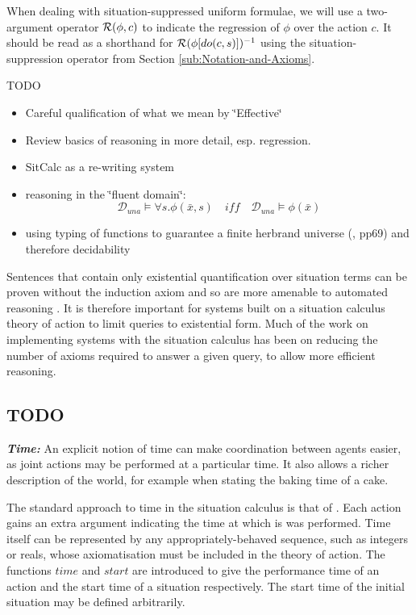 When dealing with situation-suppressed uniform formulae, we will use
a two-argument operator $\mathcal{R}(\phi,c)$ to indicate the regression
of $\phi$ over the action $c$. It should be read as a shorthand
for $\mathcal{R}(\phi[do(c,s)])^{-1}$ using the situation-suppression operator
from Section \ref{sub:Notation-and-Axioms}.

TODO

\begin{itemize}
\item Careful qualification of what we mean by \char`\"{}Effective\char`\"{} 
\item Review basics of reasoning in more detail, esp. regression. 
\item SitCalc as a re-writing system 
\item reasoning in the \char`\"{}fluent domain\char`\"{}: \[
\mathcal{D}_{una}\models\forall s.\phi(\bar{x},s)\,\,\,\,\,\, iff\,\,\,\,\,\,\mathcal{D}_{una}\models\phi(\bar{x})\]

\item using typing of functions to guarantee a finite herbrand universe
(\citet{levesque04krr_book}, pp69) and therefore decidability 
\end{itemize}
Sentences that contain only existential quantification over situation
terms can be proven without the induction axiom and so are more amenable
to automated reasoning \citep{pirri99contributions_sitcalc}. It is
therefore important for systems built on a situation calculus theory
of action to limit queries to existential form. Much of the work on
implementing systems with the situation calculus has been on reducing
the number of axioms required to answer a given query, to allow more
efficient reasoning.


\subsection{TODO}

\textbf{\emph{Time:}} An explicit notion of time can make coordination
between agents easier, as joint actions may be performed at a particular
time. It also allows a richer description of the world, for example
when stating the baking time of a cake.

The standard approach to time in the situation calculus is that of
\citet{reiter96sc_nat_conc,pinto94temporal}. Each action gains an
extra argument indicating the time at which is was performed. Time
itself can be represented by any appropriately-behaved sequence, such
as integers or reals, whose axiomatisation must be included in the
theory of action. The functions $time$ and $start$ are introduced
to give the performance time of an action and the start time of a
situation respectively. The start time of the initial situation may
be defined arbitrarily.

